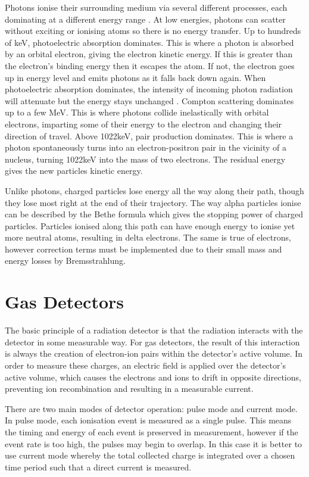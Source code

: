 Photons ionise their surrounding medium via several different processes, each dominating at a different energy range \cite{sauli_book}. At low energies, photons can scatter without exciting or ionising atoms so there is no energy transfer. Up to hundreds of keV, photoelectric absorption dominates. This is where a photon is absorbed by an orbital electron, giving the electron kinetic energy. If this is greater than the electron's binding energy then it escapes the atom. If not, the electron goes up in energy level and emits photons as it falls back down again. When photoelectric absorption dominates, the intensity of incoming photon radiation will attenuate but the energy stays unchanged \cite{knoll_book}. Compton scattering dominates up to a few MeV. This is where photons collide inelastically with orbital electrons, imparting some of their energy to the electron and changing their direction of travel. Above 1022keV, pair production dominates. This is where a photon spontaneously turns into an electron-positron pair in the vicinity of a nucleus, turning 1022keV into the mass of two electrons. The residual energy gives the new particles kinetic energy.

Unlike photons, charged particles lose energy all the way along their path, though they lose most right at the end of their trajectory. The way alpha particles ionise can be described by the Bethe formula which gives the stopping power of charged particles. Particles ionised along this path can have enough energy to ionise yet more neutral atoms, resulting in delta electrons. The same is true of electrons, however correction terms must be implemented due to their small mass and energy losses by Bremsstrahlung.

\section{Gas Detectors}

The basic principle of a radiation detector is that the radiation interacts with the detector in some measurable way. For gas detectors, the result of this interaction is always the creation of electron-ion pairs within the detector’s active volume. In order to measure these charges, an electric field is applied over the detector’s active volume, which causes the electrons and ions to drift in opposite directions, preventing ion recombination and resulting in a measurable current.

There are two main modes of detector operation: pulse mode and current mode. In pulse mode, each ionisation event is measured as a single pulse. This means the timing and energy of each event is preserved in measurement, however if the event rate is too high, the pulses may begin to overlap. In this case it is better to use current mode whereby the total collected charge is integrated over a chosen time period such that a direct current is measured.

